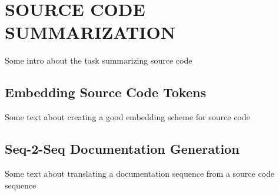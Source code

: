 \chapter{SOURCE CODE SUMMARIZATION\label{chapter:summarization}}

Some intro about the task summarizing source code

\section{Embedding Source Code Tokens\label{sec:code_embedding}}

Some text about creating a good embedding scheme for source code

\section{Seq-2-Seq Documentation Generation\label{sec:seq2seq}}

Some text about translating a documentation sequence from a source code sequence
